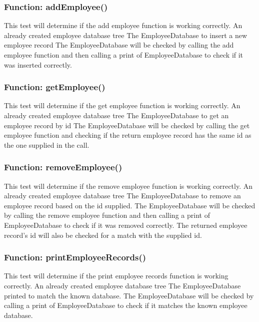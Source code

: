 \documentclass[12pt]{article}%
\newcounter{subsubsubsection}[subsubsection]
\begin{document}
\subsubsection{Function: addEmployee()}
This test will determine if the add employee function is working correctly.
An already created employee database tree
The EmployeeDatabase to insert a new employee record
The EmployeeDatabase will be checked by calling the add employee function and then calling a print of EmployeeDatabase to check if it was inserted correctly.

\subsubsection{Function: getEmployee()}
This test will determine if the get employee function is working correctly.
An already created employee database tree
The EmployeeDatabase to get an employee record by id
The EmployeeDatabase will be checked by calling the get employee function and checking if the return employee record has the same id as the one supplied in the call.

\subsubsection{Function: removeEmployee()}
This test will determine if the remove employee function is working correctly.
An already created employee database tree
The EmployeeDatabase to remove an employee record based on the id supplied.
The EmployeeDatabase will be checked by calling the remove employee function and then calling a print of EmployeeDatabase to check if it was removed correctly. The returned employee record's id will also be checked for a match with the supplied id.

\subsubsection{Function: printEmployeeRecords()}
This test will determine if the print employee records function is working correctly.
An already created employee database tree
The EmployeeDatabase printed to match the known database.
The EmployeeDatabase will be checked by calling a print of EmployeeDatabase to check if it matches the known employee database.
\end{document}
